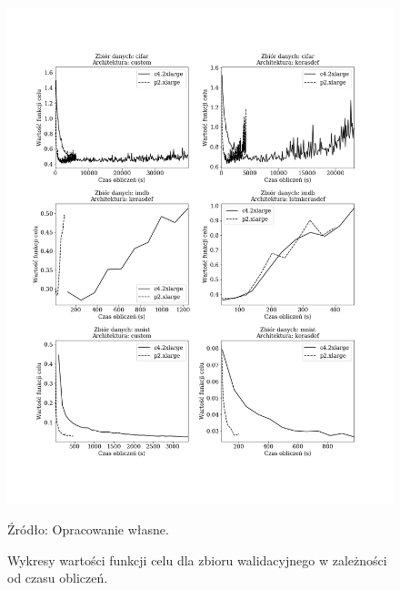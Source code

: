 \documentclass[12pt,a4paper,twoside]{article}
\newcommand{\source}[1]{\caption*{\hfill Źródło: {#1}} }
\begin{document}
\begin{figure}[h]
  \centering
\includegraphics[scale=0.5]{../obrazy/fig:experiment_loss_val_timecum.png}
\caption{Wykresy wartości funkcji celu dla zbioru walidacyjnego w zależności od czasu obliczeń.\label{fig:experiment_loss_val_timecum}}
\source{Opracowanie własne.}
\end{figure}
\end{document}
